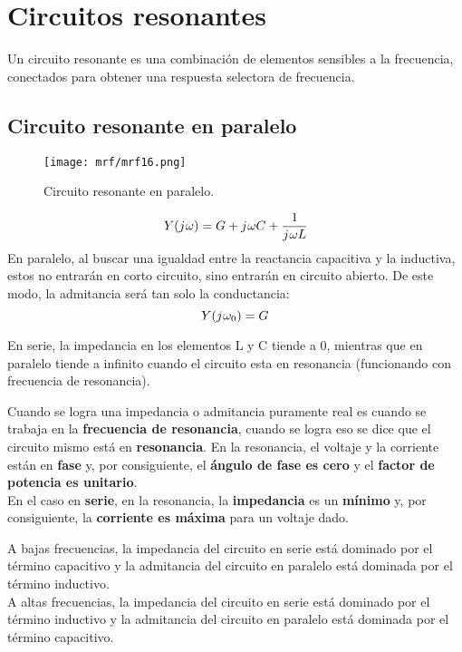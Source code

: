 \documentclass[
	12pt, %
	fleqn, %
	a4paper, %
	oneside, %
]{LegrandOrangeBook}
\begin{document}
\section{Circuitos resonantes}
Un circuito resonante es una combinación de elementos sensibles a la frecuencia, conectados para obtener una respuesta selectora de frecuencia.
\subsection*{Circuito resonante en paralelo}
\begin{figure}[H]
\centering
\texttt{[image: mrf/mrf16.png]}
\caption{Circuito resonante en paralelo.}
\end{figure}
\begin{equation}
Y({j\mkern1mu}\omega)=G+{j\mkern1mu}\omega C+\frac{1}{{j\mkern1mu}\omega L}
\end{equation}
En paralelo, al buscar una igualdad entre la reactancia capacitiva y la inductiva, estos no entrarán en corto circuito, sino entrarán en circuito abierto. De este modo, la admitancia será tan solo la conductancia:
\begin{displaymath}
Y({j\mkern1mu}\omega_0)=G
\end{displaymath}
\begin{notation}
En serie, la impedancia en los elementos L y C tiende a 0, mientras que en paralelo tiende a infinito cuando el circuito esta en resonancia (funcionando con frecuencia de resonancia).
\end{notation}
Cuando se logra una impedancia o admitancia puramente real es cuando se trabaja en la \textbf{frecuencia de resonancia}, cuando se logra eso se dice que el circuito mismo está en \textbf{resonancia}. En la resonancia, el voltaje y la corriente están en \textbf{fase} y, por consiguiente, el \textbf{ángulo de fase es cero} y el \textbf{factor de potencia es unitario}.\\
En el caso en \textbf{serie}, en la resonancia, la \textbf{impedancia} es un \textbf{mínimo} y, por consiguiente, la \textbf{corriente es máxima} para un voltaje dado.
\begin{notation}
A bajas frecuencias, la impedancia del circuito en serie está dominado por el término capacitivo y la admitancia del circuito en paralelo está dominada por el término inductivo.\\
A altas frecuencias, la impedancia del circuito en serie está dominado por el término inductivo y la admitancia del circuito en paralelo está dominada por el término capacitivo.
\end{notation}
\end{document}
